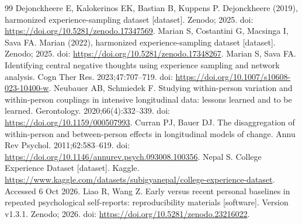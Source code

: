 \documentclass[pdflatex,sn-vancouver-num]{sn-jnl}
\begin{document}
\begin{thebibliography}{99}
 Dejonckheere E, Kalokerinos EK, Bastian B, Kuppens P. Dejonckheere (2019), harmonized experience-sampling dataset [dataset]. Zenodo; 2025. doi: \url{https://doi.org/10.5281/zenodo.17347569}.
 Marian S, Costantini G, Macsinga I, Sava FA. Marian (2022), harmonized experience-sampling dataset [dataset]. Zenodo; 2025. doi: \url{https://doi.org/10.5281/zenodo.17348267}.
 Marian S, Sava FA. Identifying central negative thoughts using experience sampling and network analysis. Cogn Ther Res. 2023;47:707--719. doi: \url{https://doi.org/10.1007/s10608-023-10400-w}.
 Neubauer AB, Schmiedek F. Studying within-person variation and within-person couplings in intensive longitudinal data: lessons learned and to be learned. Gerontology. 2020;66(4):332--339. doi: \url{https://doi.org/10.1159/000507993}.
 Curran PJ, Bauer DJ. The disaggregation of within-person and between-person effects in longitudinal models of change. Annu Rev Psychol. 2011;62:583--619. doi: \url{https://doi.org/10.1146/annurev.psych.093008.100356}.
 Nepal S. College Experience Dataset [dataset]. Kaggle. \url{https://www.kaggle.com/datasets/subigyanepal/college-experience-dataset}. Accessed 6 Oct 2026.
 Liao R, Wang Z. Early versus recent personal baselines in repeated psychological self-reports: reproducibility materials [software]. Version v1.3.1. Zenodo; 2026. doi: \url{https://doi.org/10.5281/zenodo.23216022}.
\end{thebibliography}
\end{document}
